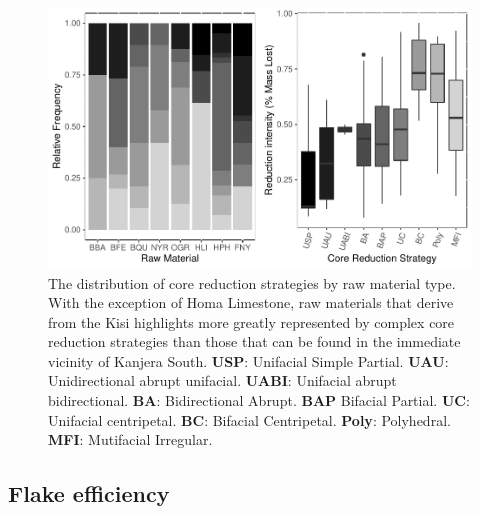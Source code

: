 \documentclass[]{elsarticle} %
\makeatletter
\def\maxwidth{\ifdim\Gin@nat@width>\linewidth\linewidth
\else\Gin@nat@width\fi}
\let\Oldincludegraphics\includegraphics
\renewcommand{\includegraphics}[1]{\Oldincludegraphics[width=\maxwidth]{#1}}
\makeatother
\begin{document}
\begin{figure}
\centering
\includegraphics{Reeves_Braun_et_al_2020_Kanjera_South_JHE_files/figure-latex/Figure distribution of core reduction strategies by raw material-1.pdf}
\caption{The distribution of core reduction strategies by raw material
type. With the exception of Homa Limestone, raw materials that derive
from the Kisi highlights more greatly represented by complex core
reduction strategies than those that can be found in the immediate
vicinity of Kanjera South. \textbf{USP}: Unifacial Simple Partial.
\textbf{UAU}: Unidirectional abrupt unifacial. \textbf{UABI}: Unifacial
abrupt bidirectional. \textbf{BA}: Bidirectional Abrupt. \textbf{BAP}
Bifacial Partial. \textbf{UC}: Unifacial centripetal. \textbf{BC}:
Bifacial Centripetal. \textbf{Poly}: Polyhedral. \textbf{MFI}:
Mutifacial Irregular. \label{core.tech}}
\end{figure}

\hypertarget{flake-efficiency}{%
\subsection{Flake efficiency}\label{flake-efficiency}}
\end{document}
